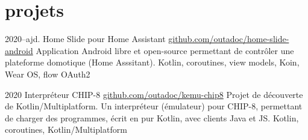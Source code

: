 \documentclass[]{friggeri-cv}
\begin{document}
\section{projets}

\begin{entrylist}
    \entry
    {2020--ajd.}
    {Home Slide pour Home Assistant}
    {\href{https://github.com/outadoc/home-slide-android}{github.com/outadoc/home-slide-android}}
    {Application Android libre et open-source permettant de contrôler une plateforme domotique (Home Asssitant).}
    {Kotlin, coroutines, view models, Koin, Wear OS, flow OAuth2}

    \entry
    {2020}
    {Interpréteur CHIP-8}
    {\href{https://github.com/outadoc/kemu-chip8}{github.com/outadoc/kemu-chip8}}
    {Projet de découverte de Kotlin/Multiplatform. Un interpréteur (émulateur) pour CHIP-8, permettant de charger des programmes, écrit en pur Kotlin, avec clients Java et JS.}
    {Kotlin, coroutines, Kotlin/Multiplatform}

\end{entrylist}
\end{document}
